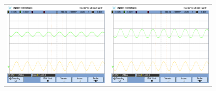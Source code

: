 \begin{figure}[H]
    \centering
    \begin{tabular}{c c}
        \includegraphics[scale=0.2]{../EJ5/Mediciones/Osciloscopio/Senoide_440_Minimo/scope_1.png} &
        \includegraphics[scale=0.2]{../EJ5/Mediciones/Osciloscopio/Senoide_440_Minimo/scope_2.png} \\

\end{tabular}
\end{figure}
